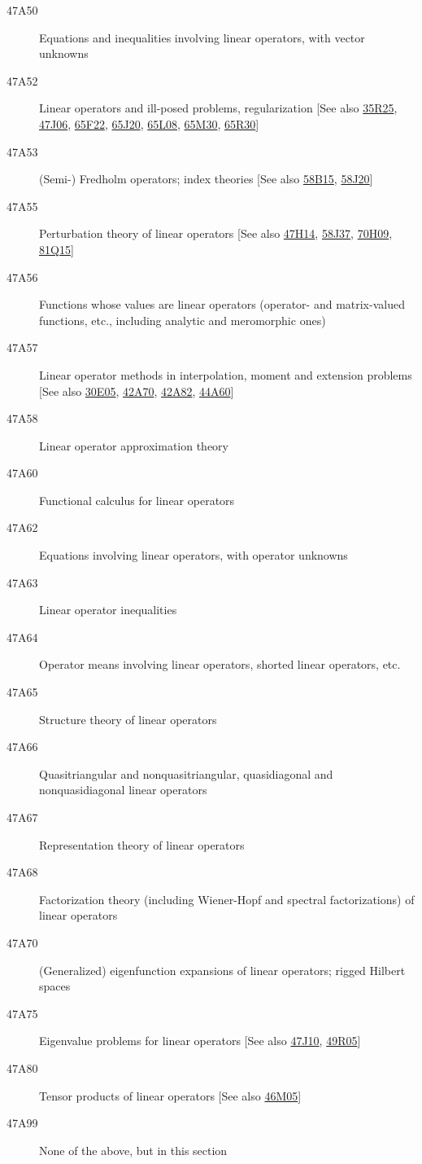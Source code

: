 \begin{description}
\item [47A50]\label{47A50} Equations and inequalities involving linear operators, with vector unknowns
\item [47A52]\label{47A52} Linear operators and ill-posed problems, regularization [See also \hyperref[35R25]{35R25}, \hyperref[47J06]{47J06}, \hyperref[65F22]{65F22}, \hyperref[65J20]{65J20}, \hyperref[65L08]{65L08}, \hyperref[65M30]{65M30}, \hyperref[65R30]{65R30}]
\item [47A53]\label{47A53} (Semi-) Fredholm operators; index theories [See also \hyperref[58B15]{58B15}, \hyperref[58J20]{58J20}]
\item [47A55]\label{47A55} Perturbation theory of linear operators [See also \hyperref[47H14]{47H14}, \hyperref[58J37]{58J37}, \hyperref[70H09]{70H09}, \hyperref[81Q15]{81Q15}]
\item [47A56]\label{47A56} Functions whose values are linear operators (operator- and matrix-valued functions, etc., including analytic and meromorphic ones)
\item [47A57]\label{47A57} Linear operator methods in interpolation, moment and extension problems [See also \hyperref[30E05]{30E05}, \hyperref[42A70]{42A70}, \hyperref[42A82]{42A82}, \hyperref[44A60]{44A60}]
\item [47A58]\label{47A58} Linear operator approximation theory
\item [47A60]\label{47A60} Functional calculus for linear operators
\item [47A62]\label{47A62} Equations involving linear operators, with operator unknowns
\item [47A63]\label{47A63} Linear operator inequalities
\item [47A64]\label{47A64} Operator means involving linear operators, shorted linear operators, etc.
\item [47A65]\label{47A65} Structure theory of linear operators
\item [47A66]\label{47A66} Quasitriangular and nonquasitriangular, quasidiagonal and nonquasidiagonal linear operators
\item [47A67]\label{47A67} Representation theory of linear operators
\item [47A68]\label{47A68} Factorization theory (including Wiener-Hopf and spectral factorizations) of linear operators
\item [47A70]\label{47A70} (Generalized) eigenfunction expansions of linear operators; rigged Hilbert spaces
\item [47A75]\label{47A75} Eigenvalue problems for linear operators [See also \hyperref[47J10]{47J10}, \hyperref[49R05]{49R05}]
\item [47A80]\label{47A80} Tensor products of linear operators [See also \hyperref[46M05]{46M05}]
\item [47A99]\label{47A99} None of the above, but in this section
\end{description}
